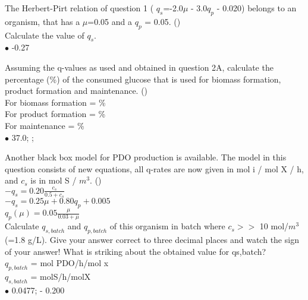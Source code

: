 \documentclass[]{beamer}
\begin{document}
\begin{frame}[shrink] {} 
\color{blue}
The Herbert-Pirt relation of  question 1 ({\color{gray} $q_{s}$=-2.0$\mu$ - 3.0$q_{p}$ - 0.020}) belongs to an organism, that has a $\mu$=0.05 and a $q_{p}$ = 0.05. ({\color{green}{Q2a}})\\[0.3em]
Calculate the value of $q_{s}$.\\
\color{black}
\setlength{\parindent}{-0.4cm}
{\color{red}$\bullet$} -0.27  \\
\end{frame}


\begin{frame}[shrink] {} 
\color{blue}
Assuming the q-values as used and obtained in question 2A, calculate the percentage (\%) of the consumed glucose that is used for biomass formation, product formation and maintenance.  ({\color{green}{Q2b}})\\
\color{black}
\setlength{\parindent}{-0.4cm}
For biomass formation = \underline{\quad } \%\\
For product formation = \underline{\quad } \%\\
For maintenance = \underline{\quad } \%\\[0.5em]
{\color{red}$\bullet$} 37.0; ;  \\
\end{frame}


\begin{frame}[shrink] {} 
\color{blue}
Another black box model for PDO production is available. The model in this question consists of new equations, all q-rates are now given in mol i / mol X / h, and $c_s$ is in mol S / $m^{3}$. ({\color{green}{Q3a}})\\[0.3em]
\color{gray}
$- q_s = 0.20\frac{{c_s^{}}}{{0.5 + c_s^{}}}$\\[0.3em]
$- q_s = 0.25\mu  + 0.80q_p^{} + 0.005$\\[0.3em]
$q_p(\mu ) = 0.05\frac{\mu }{{0.03 + \mu }}$\\[0.3em]
\color{blue}
Calculate $q_{s,batch}$ and $q_{p,batch}$ of this organism in batch where $c_{s} >>$ 10 mol/$m^{3}$ (=1.8 g/L). Give your answer correct to three decimal places and watch the sign of your answer! What is striking about the obtained value for qs,batch?\\
\color{black}
\setlength{\parindent}{-0.4cm}
$q_{p,batch}$ = \underline{\quad } mol PDO/h/mol x\\
$q_{s,batch}$ = \underline{\quad } molS/h/molX\\[0.5em]
{\color{red}$\bullet$} 0.0477; \quad - 0.200 \\
\end{frame}
\end{document}
